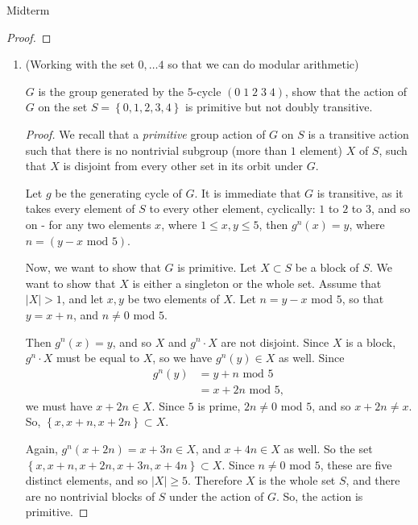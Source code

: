 \documentclass[12pt]{article}
\theoremstyle{definition}
\newenvironment{problem}[2][Problem]{\begin{trivlist}
\item[\hskip \labelsep {\bfseries #1}\hskip \labelsep {\bfseries #2.}]}{\end{trivlist}}
\begin{document}
\begin{section}{Midterm}
\begin{problem}{1}
\begin{enumerate}[label=(\alph*)]
\begin{proof}
			\end{proof}
	\end{enumerate}
\end{problem}
\begin{problem}{2}
	\begin{enumerate}[label=(\alph*)]
		\item (Working with the set $0, \dots 4$ so that we can do modular arithmetic)
			\par $G$ is the group generated by the $5$-cycle $\left( 0 \;1 \; 2 \; 3 \; 4 \right)$, show that the action of $G$ on the set $ S = \left\{ 0, 1,2,3,4\right\}$ is primitive but not doubly transitive.
			\begin{proof}
				We recall that a \textit{primitive} group action of $G$ on $S$ is a transitive action such that there is no nontrivial subgroup (more than $1$ element) $X$ of $S$, such that $X $ is disjoint from every other set in its orbit under $G$.
				\par Let $g$ be the generating cycle of $G$. It is immediate that $G$ is transitive, as it takes every element of $S$ to every other element, cyclically: $1$ to $2$ to $3$, and so on - for any two elements $x$, where $1 \leq x,y \leq 5$, then $g^{n}(x) = y$, where $n = (y - x \text{ mod } 5)$.
				\par Now, we want to show that $G$ is primitive. Let $X \subset S$ be a block of $S$. We want to show that $X$ is either a singleton or the whole set. Assume that $\left \lvert {  X } \right \lvert > 1$, and let $x, y$ be two elements of $X$. Let $n = y - x$ mod $5$, so that $y = x + n$, and $n \neq 0$ mod $5$.
				\par Then $g^n(x) = y$, and so $X$ and $g^n \cdot X$ are not disjoint. Since $X$ is a block, $g^n \cdot X$ must be equal to $X$, so we have $g^n(y) \in X$ as well. Since \begin{align*}g^n(y) &= y + n \text{ mod } 5\\
				&=  x + 2n \text{ mod }5,\end{align*}
				we must have $x + 2n \in X$. Since $5$ is prime, $2n \neq 0$ mod $5$, and so $x + 2n \neq x$. So, $\left\{ x, x + n, x+ 2n \right\} \subset X$. 
				\par Again, $g^n(x + 2n) = x + 3n \in X$, and $x + 4n \in X$ as well. So the set $\left\{ x, x + n, x + 2n, x+ 3n, x + 4n \right\} \subset X$. Since $n \neq 0$ mod $5$, these are five distinct elements, and so $\lvert X \rvert \geq 5$. Therefore $X$ is the whole set $S$, and there are no nontrivial blocks of $S$ under the action of $G$. So, the action is primitive.

\end{proof}
\end{enumerate}
\end{problem}
\end{section}
\end{document}
